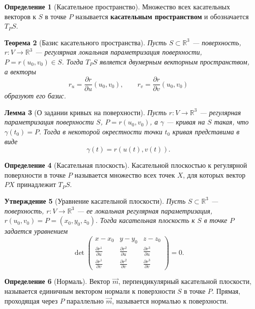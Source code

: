 \documentclass[12pt,a4paper]{article}
\newtheorem{theorem}{Теорема}[section]
\newtheorem{lemma}[theorem]{Лемма}
\newtheorem{proposition}[theorem]{Утверждение}
\theoremstyle{definition}
\newtheorem{definition}[theorem]{Определение}
\begin{document}
\begin{definition}[Касательное пространство]
Множество всех касательных векторов к $S$ в точке $P$ называется \textbf{касательным пространством} и обозначается $T_P S$.
\end{definition}

\begin{theorem}[Базис касательного пространства]
Пусть $S \subset \mathbb{R}^3$ --- поверхность, $r: V \to \mathbb{R}^3$ --- регулярная локальная параметризация поверхности, $P = r(u_0, v_0) \in S$. Тогда $T_P S$ является двумерным векторным пространством, а векторы
$$r_u = \frac{\partial r}{\partial u}(u_0, v_0), \qquad r_v = \frac{\partial r}{\partial v}(u_0, v_0)$$
образуют его базис.
\end{theorem}

\begin{lemma}[О задании кривых на поверхности]
Пусть $r: V \to \mathbb{R}^3$ --- регулярная параметризация поверхности $S$, $P = r(u_0, v_0)$, а $\gamma$ --- кривая на $S$ такая, что $\gamma(t_0) = P$. Тогда в некоторой окрестности точки $t_0$ кривая представима в виде
$$\gamma(t) = r(u(t), v(t)).$$
\end{lemma}

\begin{definition}[Касательная плоскость]
Касательной плоскостью к регулярной поверхности в точке $P$ называется множество всех точек $X$, для которых вектор $PX$ принадлежит $T_P S$.
\end{definition}

\begin{proposition}[Уравнение касательной плоскости]
Пусть $S \subset \mathbb{R}^3$ --- поверхность, $r: V \to \mathbb{R}^3$ --- ее локальная регулярная параметризация, $r(u_0, v_0)=P=(x_0,y_0,z_0)$. Тогда касательная плоскость к $S$ в точке $P$ задается уравнением
$$
\det \begin{pmatrix}
x-x_0 & y-y_0 & z-z_0 \\
\frac{\partial r^1}{\partial u} & \frac{\partial r^2}{\partial u} & \frac{\partial r^3}{\partial u} \\
\frac{\partial r^1}{\partial v} & \frac{\partial r^2}{\partial v} & \frac{\partial r^3}{\partial v}
\end{pmatrix} = 0.
$$
\end{proposition}

\begin{definition}[Нормаль]
Вектор $\vec{m}$, перпендикулярный касательной плоскости, называется единичным вектором нормали к поверхности $S$ в точке $P$. Прямая, проходящая через $P$ параллельно $\vec{m}$, называется нормалью к поверхности.
\end{definition}
\end{document}
